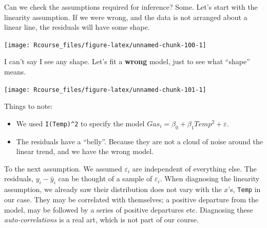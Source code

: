 \documentclass[]{book}
\newenvironment{Shaded}{\begin{snugshade}}{\end{snugshade}}
\newcommand{\KeywordTok}[1]{\textcolor[rgb]{0.13,0.29,0.53}{\textbf{{#1}}}}
\newcommand{\DataTypeTok}[1]{\textcolor[rgb]{0.13,0.29,0.53}{{#1}}}
\newcommand{\DecValTok}[1]{\textcolor[rgb]{0.00,0.00,0.81}{{#1}}}
\newcommand{\FloatTok}[1]{\textcolor[rgb]{0.00,0.00,0.81}{{#1}}}
\newcommand{\StringTok}[1]{\textcolor[rgb]{0.31,0.60,0.02}{{#1}}}
\newcommand{\NormalTok}[1]{{#1}}
\providecommand{\tightlist}{%
  \setlength{\itemsep}{0pt}\setlength{\parskip}{0pt}}
\theoremstyle{definition}
\theoremstyle{definition}
\theoremstyle{remark}
\begin{document}
Can we check the assumptions required for inference? Some. Let's start
with the linearity assumption. If we were wrong, and the data is not
arranged about a linear line, the residuals will have some shape.

\begin{Shaded}
\end{Shaded}

\texttt{[image: Rcourse\_files/figure-latex/unnamed-chunk-100-1]}

I can't say I see any shape. Let's fit a \textbf{wrong} model, just to
see what ``shape'' means.

\begin{Shaded}
\end{Shaded}

\texttt{[image: Rcourse\_files/figure-latex/unnamed-chunk-101-1]}

Things to note:

\begin{itemize}
\tightlist
\item
  We used \texttt{I(Temp)\^{}2} to specify the model
  \(Gas_i=\beta_0 + \beta_1 Temp^2+ \varepsilon\).
\item
  The residuals have a ``belly''. Because they are not a cloud of noise
  around the linear trend, and we have the wrong model.
\end{itemize}

To the next assumption. We assumed \(\varepsilon_i\) are independent of
everything else. The residuals, \(y_i-\hat y_i\) can be thought of a
sample of \(\varepsilon_i\). When diagnosing the linearity assumption,
we already saw their distribution does not vary with the \(x\)'s,
\texttt{Temp} in our case. They may be correlated with themselves; a
positive departure from the model, may be followed by a series of
positive departures etc. Diagnosing these \emph{auto-correlations} is a
real art, which is not part of our course.
\end{document}
